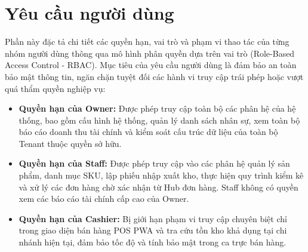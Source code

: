 \documentclass[12pt,a4paper]{report}
\begin{document}
	\section{Yêu cầu người dùng}
	Phần này đặc tả chi tiết các quyền hạn, vai trò và phạm vi thao tác của từng nhóm người dùng thông qua mô hình phân quyền dựa trên vai trò (Role-Based Access Control - RBAC). Mục tiêu của yêu cầu người dùng là đảm bảo an toàn bảo mật thông tin, ngăn chặn tuyệt đối các hành vi truy cập trái phép hoặc vượt quá thẩm quyền nghiệp vụ:
	\begin{itemize}
		\item \textbf{Quyền hạn của Owner:} Được phép truy cập toàn bộ các phân hệ của hệ thống, bao gồm cấu hình hệ thống, quản lý danh sách nhân sự, xem toàn bộ báo cáo doanh thu tài chính và kiểm soát cấu trúc dữ liệu của toàn bộ Tenant thuộc quyền sở hữu.
		\item \textbf{Quyền hạn của Staff:} Được phép truy cập vào các phân hệ quản lý sản phẩm, danh mục SKU, lập phiếu nhập xuất kho, thực hiện quy trình kiểm kê và xử lý các đơn hàng chờ xác nhận từ Hub đơn hàng. Staff không có quyền xem các báo cáo tài chính cấp cao của Owner.
		\item \textbf{Quyền hạn của Cashier:} Bị giới hạn phạm vi truy cập chuyên biệt chỉ trong giao diện bán hàng POS PWA và tra cứu tồn kho khả dụng tại chi nhánh hiện tại, đảm bảo tốc độ và tính bảo mật trong ca trực bán hàng.
	\end{itemize}
	
\end{document}

